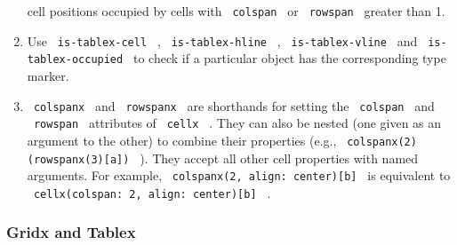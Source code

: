 \begin{enumerate}
  cell positions occupied by cells with \texttt{\ colspan\ } or
  \texttt{\ rowspan\ } greater than 1.
\item
  Use \texttt{\ is-tablex-cell\ } , \texttt{\ is-tablex-hline\ } ,
  \texttt{\ is-tablex-vline\ } and \texttt{\ is-tablex-occupied\ } to
  check if a particular object has the corresponding type marker.
\item
  \texttt{\ colspanx\ } and \texttt{\ rowspanx\ } are shorthands for
  setting the \texttt{\ colspan\ } and \texttt{\ rowspan\ } attributes
  of \texttt{\ cellx\ } . They can also be nested (one given as an
  argument to the other) to combine their properties (e.g.,
  \texttt{\ colspanx(2)(rowspanx(3){[}a{]})\ } ). They accept all other
  cell properties with named arguments. For example,
  \texttt{\ colspanx(2,\ align:\ center){[}b{]}\ } is equivalent to
  \texttt{\ cellx(colspan:\ 2,\ align:\ center){[}b{]}\ } .
\end{enumerate}

\subsubsection{Gridx and Tablex}\label{gridx-and-tablex}

